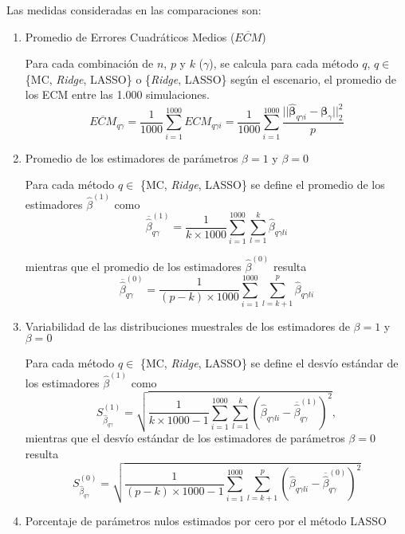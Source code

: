\documentclass[a4paper,12pt]{report}
\begin{document}
Las medidas consideradas en las comparaciones son:
\begin{enumerate}
\item Promedio de Errores Cuadráticos Medios ($\overline{ECM}$)

Para cada combinación de $n$, $p$ y $k$ ($\gamma$), se calcula para cada método $q$, $q \in $ \{MC, \textit{Ridge}, LASSO\} o \{\textit{Ridge}, LASSO\} según el escenario, el promedio de los ECM entre las 1.000 simulaciones.
\begin{equation}
\overline{ECM}_{q\gamma}=\dfrac{1}{1000}\sum_{i=1}^{1000} ECM_{q\gamma i}=\dfrac{1}{1000}\sum_{i=1}^{1000} \dfrac{||\boldsymbol{\hat{\beta}}_{q\gamma i}-\boldsymbol{\beta}_{\gamma}||_2^2}{p}
\end{equation}
\item Promedio de los estimadores de parámetros $\beta = 1$ y $\beta = 0$

Para cada método $q \in $ \{MC, \textit{Ridge}, LASSO\} se define el promedio de los estimadores $\hat{\beta}^{(1)}$ como
\begin{equation}
\overline{\hat{\beta}}_{q\gamma}^{(1)}=\dfrac{1}{k \times 1000} \sum_{i=1}^{1000} \sum_{l=1}^k \hat{\beta}_{q\gamma li}
\end{equation}

mientras que el promedio de los estimadores $\hat{\beta}^{(0)}$ resulta
\begin{equation}
\overline{\hat{\beta}}_{q\gamma}^{(0)}=\dfrac{1}{(p-k) \times 1000} \sum_{i=1}^{1000} \sum_{l=k+1}^p \hat{\beta}_{q\gamma li}
\end{equation}
\item Variabilidad de las distribuciones muestrales de los estimadores de $\beta = 1$ y $\beta = 0$

Para cada método $q \in $ \{MC, \textit{Ridge}, LASSO\} se define el desvío estándar de los estimadores $\hat{\beta}^{(1)}$ como
\begin{equation}
S_{\hat{\beta}_{q\gamma}}^{(1)}=\sqrt{\dfrac{1}{k \times 1000-1} \sum_{i=1}^{1000} \sum_{l=1}^k \left(\hat{\beta}_{q\gamma li}-\overline{\hat{\beta}}_{q\gamma}^{(1)}\right)^2},
\end{equation}
mientras que el desvío estándar de los estimadores de parámetros $\beta = 0$ resulta
\begin{equation}
S_{\hat{\beta}_{q\gamma}}^{(0)}=\sqrt{\dfrac{1}{(p-k) \times 1000-1} \sum_{i=1}^{1000} \sum_{l=k+1}^p \left(\hat{\beta}_{q\gamma li}-\overline{\hat{\beta}}_{q\gamma}^{(0)}\right)^2}
\end{equation}
\item Porcentaje de parámetros nulos estimados por cero por el método LASSO


\end{enumerate}
\end{document}
